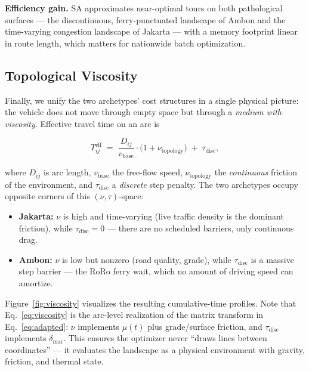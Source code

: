 \documentclass[11pt,a4paper,twocolumn]{article}
\begin{document}
\textbf{Efficiency gain.} SA approximates near-optimal tours on both
pathological surfaces --- the discontinuous, ferry-punctuated landscape of
Ambon and the time-varying congestion landscape of Jakarta --- with a
memory footprint linear in route length, which matters for nationwide
batch optimization.

\subsection{Topological Viscosity}
\label{sec:viscosity}

Finally, we unify the two archetypes' cost structures in a single physical
picture: the vehicle does not move through empty space but through a
\emph{medium with viscosity}. Effective travel time on an arc is

\begin{equation}
  \label{eq:viscosity}
  T^{\mathrm{eff}}_{ij} \;=\;
    \frac{D_{ij}}{v_{\mathrm{base}}} \cdot
    \bigl(1 + \nu_{\mathrm{topology}}\bigr)
    \;+\; \tau_{\mathrm{disc}},
\end{equation}

where $D_{ij}$ is arc length, $v_{\mathrm{base}}$ the free-flow speed,
$\nu_{\mathrm{topology}}$ the \emph{continuous} friction of the
environment, and $\tau_{\mathrm{disc}}$ a \emph{discrete} step penalty.
The two archetypes occupy opposite corners of this
$(\nu, \tau)$-space:

\begin{itemize}[leftmargin=1.3em, itemsep=0.1em]
  \item \textbf{Jakarta:} $\nu$ is high and time-varying (live traffic
    density is the dominant friction), while $\tau_{\mathrm{disc}} = 0$
    --- there are no scheduled barriers, only continuous drag.
  \item \textbf{Ambon:} $\nu$ is low but nonzero (road quality, grade),
    while $\tau_{\mathrm{disc}}$ is a massive step barrier --- the RoRo
    ferry wait, which no amount of driving speed can amortize.
\end{itemize}

Figure~\ref{fig:viscosity} visualizes the resulting cumulative-time
profiles. Note that Eq.~\eqref{eq:viscosity} is the arc-level realization
of the matrix transform in Eq.~\eqref{eq:adapted}: $\nu$ implements
$\mu(t)$ plus grade/surface friction, and $\tau_{\mathrm{disc}}$
implements $\delta_{\mathrm{mar}}$. This ensures the optimizer never
``draws lines between coordinates'' --- it evaluates the landscape as a
physical environment with gravity, friction, and thermal state.
\end{document}
